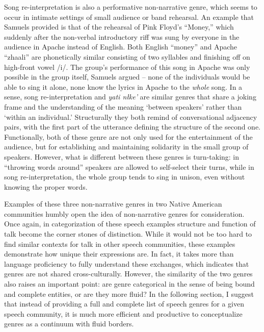 \documentclass[12pt, draft]{article}
\begin{document}
Song re-interpretation is also a performative non-narrative genre, which seems to occur in intimate settings of small audience or band rehearsal. An example that Samuels provided is that of the rehearsal of Pink Floyd's ``Money,'' which suddenly after the non-verbal introductory riff was sung by everyone in the audience in Apache instead of English. Both English ``money'' and Apache ``zhaali'' are phonetically similar consisting of two syllables and finishing off on high-front vowel /i/. The group's performance of this song in Apache was only possible in the group itself, Samuels argued -- none of the individuals would be able to sing it alone, none know the lyrics in Apache to the \textit{whole} song. In a sense, song re-interpretation and \textit{yati n\l ke'} are similar genres that share a joking frame and the understanding of the meaning `between speakers' rather than `within an individual.' Structurally they both remind of conversational adjacency pairs, with the first part of the utterance defining the structure of the second one. Functionally, both of these genre are not only used for the entertainment of the audience, but for establishing and maintaining solidarity in the small group of speakers. However, what is different between these genres is turn-taking: in ``throwing words around'' speakers are allowed to self-select their turns, while in song re-interpretation, the whole group tends to sing in unison, even without knowing the proper words. 

Examples of these three non-narrative genres in two Native American communities humbly open the idea of non-narrative genres for consideration. Once again, in categorization of these speech examples structure and function of talk become the corner stones of distinction. While it would not be too hard to find similar contexts for talk in other speech communities, these examples demonstrate how unique their expressions are. In fact, it takes more than language proficiency to fully understand these exchanges, which indicates that genres are not shared cross-culturally. However, the similarity of the two genres also raises an important point: are genre categorical in the sense of being bound and complete entities, or are they more fluid? In the following section, I suggest that instead of providing a full and complete list of speech genres for a given speech community, it is much more efficient and productive to conceptualize genres as a continuum with fluid borders.
\end{document}
